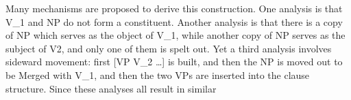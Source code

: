 Many mechanisms are proposed to derive this construction.
One analysis is that V_1 and NP do not form a constituent. %
Another analysis is that there is a copy of NP which serves as the object of V_1,
while another copy of NP serves as the subject of V2,
and only one of them is spelt out.
Yet a third analysis involves sideward movement:
first [VP V_2 \dots] is built,
and then the NP is moved out to be Merged with V_1,
and then the two VPs are inserted into the clause structure.
Since these analyses all result in similar %